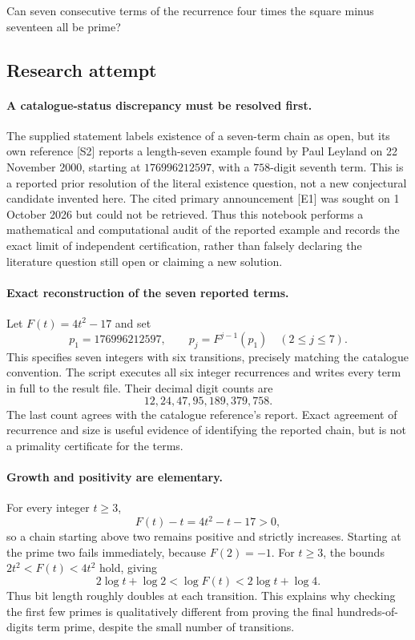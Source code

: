 \documentclass[11pt,a4paper]{article}
\begin{document}
Can seven consecutive terms of the recurrence four times the square minus seventeen all be prime?

\subsection{Research attempt}

\paragraph{A catalogue-status discrepancy must be resolved first.}
The supplied statement labels existence of a seven-term chain as open,
but its own reference [S2] reports a length-seven example found by
Paul Leyland on 22 November 2000, starting at $176996212597$, with
a $758$-digit seventh term. This is a reported prior resolution of the
literal existence question, not a new conjectural candidate invented
here. The cited primary announcement [E1] was sought on 1 October 2026
but could not be retrieved. Thus this notebook performs a mathematical
and computational audit of the reported example and records the exact
limit of independent certification, rather than falsely declaring the
literature question still open or claiming a new solution.

\paragraph{Exact reconstruction of the seven reported terms.}
Let $F(t)=4t^2-17$ and set
\[
 p_1=176996212597,\qquad p_j=F^{j-1}(p_1)\quad(2\le j\le7).
\]
This specifies seven integers with six transitions, precisely matching
the catalogue convention. The script executes all six integer
recurrences and writes every term in full to the result file. Their
decimal digit counts are
\[
                         12,24,47,95,189,379,758.
\]
The last count agrees with the catalogue reference's report. Exact
agreement of recurrence and size is useful evidence of identifying the
reported chain, but is not a primality certificate for the terms.

\paragraph{Growth and positivity are elementary.}
For every integer $t\ge3$,
\[
 F(t)-t=4t^2-t-17>0,
\]
so a chain starting above two remains positive and strictly increases.
Starting at the prime two fails immediately, because $F(2)=-1$.
For $t\ge3$, the bounds $2t^2<F(t)<4t^2$ hold, giving
\[
 2\log t+\log2<\log F(t)<2\log t+\log4.
\]
Thus bit length roughly doubles at each transition. This explains why
checking the first few primes is qualitatively different from proving
the final hundreds-of-digits term prime, despite the small number of
transitions.
\end{document}
